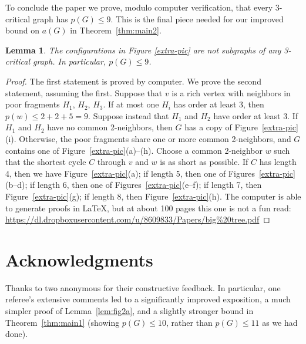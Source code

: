 \documentclass[12pt]{article}
\theoremstyle{plain}
\newtheorem*{mainthm2}{Theorem~2}
\newtheorem{lem}[prop]{Lemma}
\theoremstyle{definition}
\theoremstyle{remark}
\def\hajos{Haj\'{o}s}
\begin{document}
To conclude the paper we prove, modulo computer verification, that every
3-critical graph has $p(G)\le 9$.  This is the final piece needed for our
improved bound on $a(G)$ in Theorem~\ref{thm:main2}.

\begin{lem}\label{225}
The configurations in Figure \ref{extra-pic} are not subgraphs of any
3-critical graph.  
In particular, $p(G)\le 9$.
\end{lem}
\begin{proof}
The first statement is proved by computer.  We prove the second statement,
assuming the first.
Suppose that $v$ is a rich vertex with neighbors in poor fragments $H_1$, $H_2$,
$H_3$.  If at most one $H_i$ has order at least 3, then $p(w)\le 2+2+5=9$.
Suppose instead that $H_1$ and $H_2$ have order at least 3.
If $H_1$ and $H_2$ have no common 2-neighbors, then $G$ has a copy of
Figure~\ref{extra-pic}(i).  Otherwise, the poor fragments share one or more common
2-neighbors, and $G$ contains one of Figure~\ref{extra-pic}(a)--(h).
Choose a common 2-neighbor $w$ such that the shortest cycle $C$ through $v$ and
$w$ is as short as possible.  
If $C$ has length 4, then we have Figure~\ref{extra-pic}(a); 
if length 5, then one of Figures~\ref{extra-pic}(b--d); 
if length 6, then one of Figures~\ref{extra-pic}(e--f); 
if length 7, then Figure~\ref{extra-pic}(g);
if length 8, then Figure~\ref{extra-pic}(h).
The computer is able to generate proofs in \LaTeX, but at about 100 pages this
one is not a fun read:
\url{https://dl.dropboxusercontent.com/u/8609833/Papers/big%20tree.pdf}
\end{proof}


\section*{Acknowledgments}
Thanks to two anonymous for their constructive feedback.  In particular, one
referee's extensive comments led to a significantly improved exposition, a
much simpler proof of Lemma~\ref{lem:fig2a}, and a slightly stronger bound in
Theorem~\ref{thm:main1} (showing $p(G)\le 10$, rather than $p(G)\le 11$ as we
had done).


\end{document}
